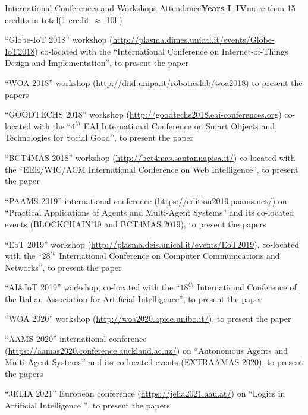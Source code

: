\begin{activity}{International Conferences and Workshops Attendance}{\textbf{Years I--IV}}{more than 15 credits in total}{(1 credit $\approx$ 10h)}
    \item ``Globe-IoT 2018'' workshop (\url{http://plasma.dimes.unical.it/events/Globe-IoT2018}) co-located with the ``International Conference on Internet-of-Things Design and Implementation'', to present the paper \cite{lpaas-ic2e2018}
    \item ``WOA 2018'' workshop (\url{http://diid.unipa.it/roboticslab/woa2018}) to present the papers \cite{blockchainlp-woa2018,spacetimelp-woa2018}
    \item ``GOODTECHS 2018'' workshop (\url{http://goodtechs2018.eai-conferences.org}) co-located with the ``$4^{th}$ EAI International Conference on Smart Objects and Technologies for Social Good'', to present the paper \cite{blockchain-goodtechs2018}
    \item ``BCT4MAS 2018'' workshop (\url{http://bct4mas.santannapisa.it/}) co-located with the ``EEE/WIC/ACM International Conference on Web Intelligence'', to present the paper \cite{bctcoord-bct4mas2018wi}
    \item ``PAAMS 2019'' international conference (\url{https://edition2019.paams.net/}) on ``Practical Applications of Agents and Multi-Agent Systems'' and its co-located events (BLOCKCHAIN'19 and BCT4MAS 2019), to present the papers \cite{autonomoussc-paams2019,proactivesc-blockchain2019,bctcoord-bct4mas2019}
    \item ``EoT 2019'' workshop (\url{http://plasma.deis.unical.it/events/EoT2019}), co-located with the ``$28^{th}$ International Conference on Computer Communications and Networks'', to present the paper \cite{tusow-icccn2019}
    \item ``AI\&IoT 2019'' workshop, co-located with the ``$18^{th}$ International Conference of the Italian Association for Artificial Intelligence'', to present the paper \cite{xmas-aiiot2019}
    \item ``WOA 2020'' workshop (\url{http://woa2020.apice.unibo.it/}), to present the paper \cite{kotlindsi4prolog-woa2020}
    \item ``AAMS 2020'' international conference (\url{https://aamas2020.conference.auckland.ac.nz/}) on ``Autonomous Agents and Multi-Agent Systems'' and its co-located events (EXTRAAMAS 2020), to present the papers \cite{agentbasedxai-aamas2020,agentbasedxai-extraamas2020}
    \item ``JELIA 2021'' European conference (\url{https://jelia2021.aau.at/}) on ``Logics in Artificial Intelligence '', to present the papers \cite{2pkt-jelia2021}

\end{activity}
